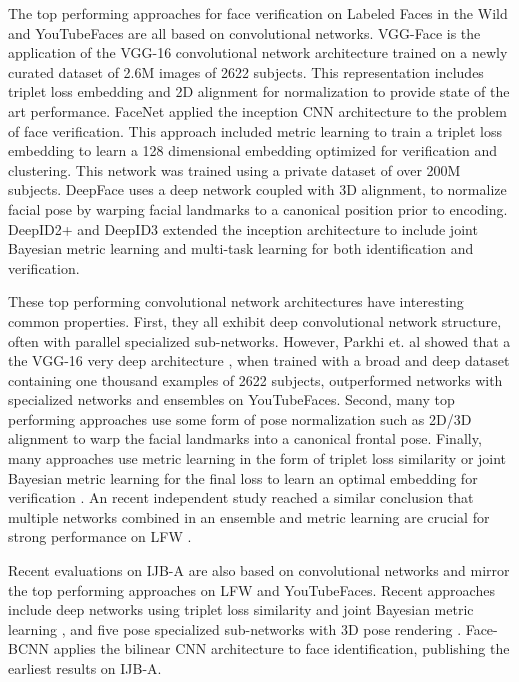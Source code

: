 \documentclass[10pt,twocolumn,letterpaper]{article}
\theoremstyle{definition}		\newtheorem{defn}[thm]{Definition}
\begin{document}
The top performing approaches for face verification on Labeled Faces in the Wild \cite{Huang07} and YouTubeFaces \cite{Wolf11} are all based on convolutional networks.  VGG-Face is the application of the VGG-16 convolutional network architecture \cite{Simonyan15} trained on a newly curated dataset of 2.6M images of 2622 subjects.  This representation includes triplet loss embedding and 2D alignment for normalization to provide state of the art performance.  
FaceNet \cite{Schroff15} applied the inception CNN architecture \cite{Szegedy15} to the problem of face verification.  This approach included metric learning to train a triplet loss embedding to learn a 128 dimensional embedding optimized for verification and clustering.  This network was trained using a private dataset of over 200M subjects.  DeepFace \cite{Taigman14}\cite{Taigman15} uses a deep network coupled with 3D alignment, to normalize facial pose by warping facial landmarks to a canonical position prior to encoding.  DeepID2+ \cite{Sun15} and DeepID3 \cite{Sun14} extended the inception architecture to include joint Bayesian metric learning \cite{Chen12} and multi-task learning for both identification and verification.  

These top performing convolutional network architectures have interesting common properties. First, they all exhibit deep convolutional network structure, often with parallel specialized sub-networks. However, Parkhi et. al \cite{Parkhi15} showed that a the VGG-16 very deep architecture  \cite{Simonyan15}, when trained with a broad and deep dataset containing one thousand examples of 2622 subjects, outperformed networks with specialized networks \cite{Schroff15} and  ensembles \cite{Sun14} on YouTubeFaces.  Second, many top performing approaches use some form of pose normalization such as 2D/3D alignment \cite{Taigman14,Parkhi15,AbdAlmageed16} to warp the facial landmarks into a canonical frontal pose.  Finally, many approaches use metric learning in the form of triplet loss similarity or joint Bayesian metric learning for the final loss to learn an optimal embedding for verification \cite{Schroff15,Parkhi15,Chen16}.  An recent independent study reached a similar conclusion that multiple networks combined in an ensemble and metric learning are crucial for strong performance on LFW \cite{Hu15}.

Recent evaluations on IJB-A \cite{Klare15} are also based on convolutional networks and mirror the top performing approaches on LFW and YouTubeFaces.  Recent approaches include deep networks using triplet loss similarity\cite{Sankaranarayanan16}\cite{Chen15} and joint Bayesian metric learning \cite{Chen16}, and five pose specialized sub-networks with 3D pose rendering \cite{AbdAlmageed16}.  Face-BCNN \cite{RoyChowdry16} applies the bilinear CNN architecture to face identification, publishing the earliest results on IJB-A.
\end{document}
